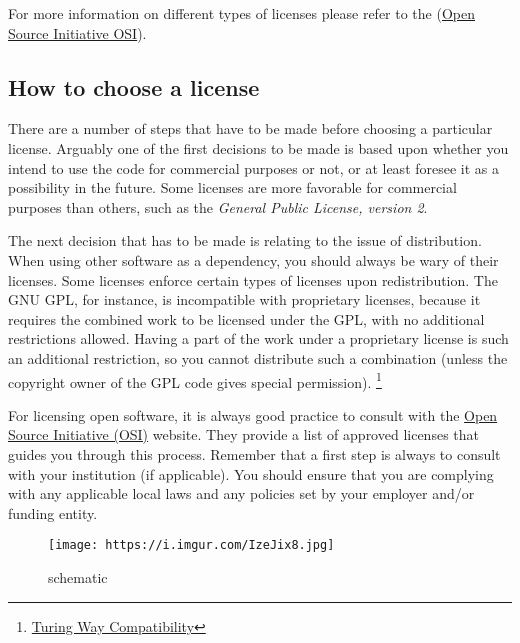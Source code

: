 \documentclass[
  letterpaper,
  DIV=11,
  numbers=noendperiod]{scrreport}
\begin{document}
For more information on different types of licenses please refer to the
(\href{https://opensource.org/licenses/category}{Open Source Initiative
OSI}).

\hypertarget{how-to-choose-a-license}{%
\subsection{How to choose a license}\label{how-to-choose-a-license}}

There are a number of steps that have to be made before choosing a
particular license. Arguably one of the first decisions to be made is
based upon whether you intend to use the code for commercial purposes or
not, or at least foresee it as a possibility in the future. Some
licenses are more favorable for commercial purposes than others, such as
the \emph{General Public License, version 2}.

The next decision that has to be made is relating to the issue of
distribution. When using other software as a dependency, you should
always be wary of their licenses. Some licenses enforce certain types of
licenses upon redistribution. The GNU GPL, for instance, is incompatible
with proprietary licenses, because it requires the combined work to be
licensed under the GPL, with no additional restrictions allowed. Having
a part of the work under a proprietary license is such an additional
restriction, so you cannot distribute such a combination (unless the
copyright owner of the GPL code gives special permission). \footnote{\href{https://the-turing-way.netlify.app/reproducible-research/licensing/licensing-compatibility.html}{Turing
  Way Compatibility}}

For licensing open software, it is always good practice to consult with
the \href{https://opensource.org/}{Open Source Initiative (OSI)}
website. They provide a list of approved licenses that guides you
through this process. Remember that a first step is always to consult
with your institution (if applicable). You should ensure that you are
complying with any applicable local laws and any policies set by your
employer and/or funding entity.

\begin{figure}

{\centering \texttt{[image: https://i.imgur.com/IzeJix8.jpg]}

}

\caption{schematic}

\end{figure}
\end{document}
